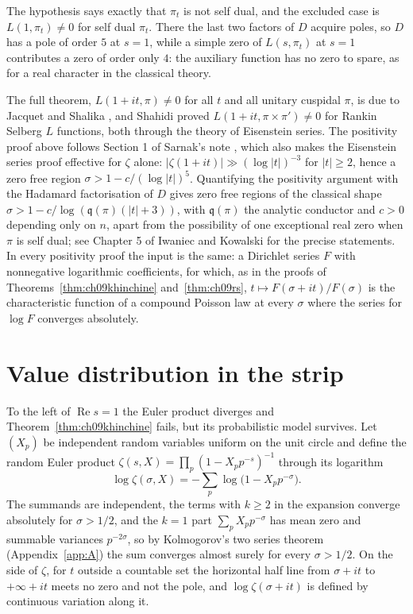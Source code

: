 The hypothesis says exactly that $\pi_t$ is not self dual, and the excluded case is $L(1,\pi_t)\ne0$ for self dual $\pi_t$. There the last two factors of $D$ acquire poles, so $D$ has a pole of order $5$ at $s=1$, while a simple zero of $L(s,\pi_t)$ at $s=1$ contributes a zero of order only $4$: the auxiliary function has no zero to spare, as for a real character in the classical theory.

The full theorem, $L(1+it,\pi)\ne0$ for all $t$ and all unitary cuspidal $\pi$, is due to Jacquet and Shalika \cite{jacquetshalika1976}, and Shahidi \cite{shahidi1981} proved $L(1+it,\pi\times\pi')\ne0$ for Rankin Selberg $L$ functions, both through the theory of Eisenstein series. The positivity proof above follows Section 1 of Sarnak's note \cite{sarnak2004}, which also makes the Eisenstein series proof effective for $\zeta$ alone: $|\zeta(1+it)|\gg(\log|t|)^{-3}$ for $|t|\ge2$, hence a zero free region $\sigma>1-c/(\log|t|)^5$. Quantifying the positivity argument with the Hadamard factorisation of $D$ gives zero free regions of the classical shape $\sigma > 1 - c/\log(\mathfrak q(\pi)(|t|+3))$, with $\mathfrak q(\pi)$ the analytic conductor and $c>0$ depending only on $n$, apart from the possibility of one exceptional real zero when $\pi$ is self dual; see Chapter 5 of Iwaniec and Kowalski \cite{iwanieckowalski2004} for the precise statements. In every positivity proof the input is the same: a Dirichlet series $F$ with nonnegative logarithmic coefficients, for which, as in the proofs of Theorems~\ref{thm:ch09khinchine} and~\ref{thm:ch09rs}, $t\mapsto F(\sigma+it)/F(\sigma)$ is the characteristic function of a compound Poisson law at every $\sigma$ where the series for $\log F$ converges absolutely.

\section{Value distribution in the strip}

To the left of $\operatorname{Re}s=1$ the Euler product diverges and Theorem~\ref{thm:ch09khinchine} fails, but its probabilistic model survives. Let $(X_p)$ be independent random variables uniform on the unit circle and define the random Euler product $\zeta(s,X) = \prod_p(1-X_pp^{-s})^{-1}$ through its logarithm
\[
\log\zeta(\sigma,X) = -\sum_p \log\bigl(1 - X_p p^{-\sigma}\bigr).
\]
The summands are independent, the terms with $k\ge 2$ in the expansion converge absolutely for $\sigma>1/2$, and the $k=1$ part $\sum_p X_p p^{-\sigma}$ has mean zero and summable variances $p^{-2\sigma}$, so by Kolmogorov's two series theorem (Appendix~\ref{app:A}) the sum converges almost surely for every $\sigma>1/2$. On the side of $\zeta$, for $t$ outside a countable set the horizontal half line from $\sigma+it$ to $+\infty+it$ meets no zero and not the pole, and $\log\zeta(\sigma+it)$ is defined by continuous variation along it.


